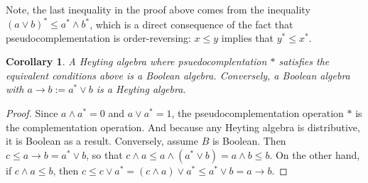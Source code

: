 \documentclass[12pt]{article}
\newtheorem{cor}{Corollary}
\begin{document}
Note, the last inequality in the proof above comes from the inequality $(a\vee b)^* \le a^* \wedge b^*$, which is a direct consequence of the fact that pseudocomplementation is order-reversing: $x\le y$ implies that $y^*\le x^*$.

\begin{cor} A Heyting algebra where psuedocomplentation $*$ satisfies the equivalent conditions above is a Boolean algebra.  Conversely, a Boolean algebra with $a\to b:= a^* \vee b$ is a Heyting algebra.  \end{cor}
\begin{proof}  Since $a\wedge a^*=0$ and $a\vee a^*=1$, the pseudocomplementation operation $*$ is the complementation operation.  And because any Heyting algebra is distributive, it is Boolean as a result.  Conversely, assume $B$ is Boolean.  Then $c\le a\to b= a^*\vee b$, so that $c\wedge a \le a\wedge (a^* \vee b) = a\wedge b \le b$.  On the other hand, if $c\wedge a\le b$, then $c\le c\vee a^* =(c\wedge a)\vee a^* \le a^* \vee b = a\to b$.
\end{proof}
\end{document}
